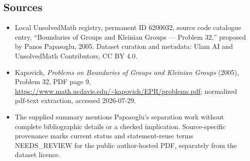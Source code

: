 \documentclass[11pt]{article}
\begin{document}
\subsection{Sources}
\begin{itemize}
\item Local UnsolvedMath registry, permanent ID 6200032, source code catalogue entry, ``Boundaries of Groups and Kleinian Groups --- Problem 32,'' proposed by Panos Papasoglu, 2005. Dataset curation and metadata: Ulam AI and UnsolvedMath Contributors, CC BY 4.0.
\item Kapovich, \emph{Problems on Boundaries of Groups and Kleinian Groups} (2005), Problem 32, PDF page 9, \url{https://www.math.ucdavis.edu/~kapovich/EPR/problems.pdf}; normalized pdf-text extraction, accessed 2026-07-29.
\item The supplied summary mentions Papasoglu's separation work without complete bibliographic details or a checked implication. Source-specific provenance marks current status and statement-reuse terms NEEDS\_REVIEW for the public author-hosted PDF, separately from the dataset licence.
\end{itemize}
\end{document}

